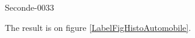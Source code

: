 
\begin{corrige}{Seconde-0033}

The result is on figure \ref{LabelFigHistoAutomobile}.
\newcommand{\CaptionFigHistoAutomobile}{<+Type your caption here+>}


\end{corrige}
